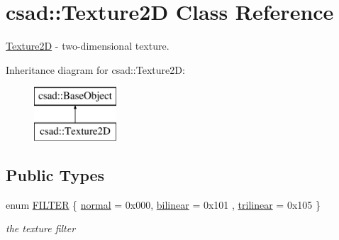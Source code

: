\hypertarget{classcsad_1_1_texture2_d}{\section{csad\-:\-:Texture2\-D Class Reference}
\label{classcsad_1_1_texture2_d}
}


\hyperlink{classcsad_1_1_texture2_d}{Texture2\-D} -\/ two-\/dimensional texture.  


Inheritance diagram for csad\-:\-:Texture2\-D\-:\begin{figure}[H]
\begin{center}
\leavevmode
\includegraphics[height=2.000000cm]{classcsad_1_1_texture2_d}
\end{center}
\end{figure}
\subsection*{Public Types}
\begin{DoxyCompactItemize}
\item 
enum \hyperlink{classcsad_1_1_texture2_d_aa1626a57afdd94d1a9cbce5628e81e39}{F\-I\-L\-T\-E\-R} \{ \hyperlink{classcsad_1_1_texture2_d_aa1626a57afdd94d1a9cbce5628e81e39a597a700ee3ef5308bf955fb0934eca69}{normal} = 0x000, 
\hyperlink{classcsad_1_1_texture2_d_aa1626a57afdd94d1a9cbce5628e81e39ae7319b4ef26324e97e6c7904fa57144d}{bilinear} = 0x101
, \hyperlink{classcsad_1_1_texture2_d_aa1626a57afdd94d1a9cbce5628e81e39a5de2d9e733b93f483acb0d648d9d37b3}{trilinear} = 0x105
 \}
\begin{DoxyCompactList}\small\item\em the texture filter \end{DoxyCompactList}\end{DoxyCompactItemize}
